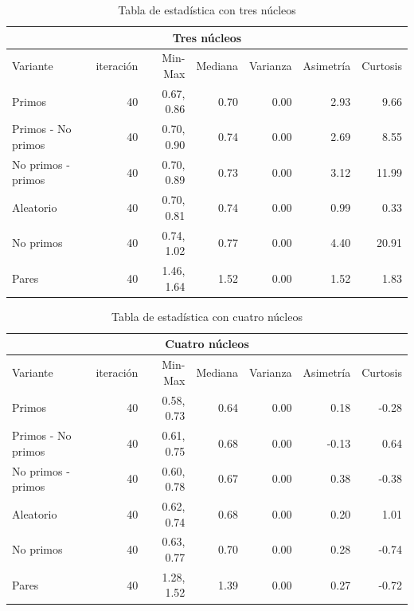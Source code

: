 \documentclass{article}
\begin{document}
\begin{table}[H]
\begin{center}
\begin{tabular}{|l | r | r | r | r | r | r|}
\hline
\multicolumn{7}{|c|}{Tres núcleos}\\
\hline
Variante&iteración&Min-Max&Mediana&Varianza&Asimetría&Curtosis\\
\hline
 Primos               & 40 & 0.67, 0.86  & 0.70 & 0.00 & 2.93   & 9.66\\
 Primos - No primos   & 40 & 0.70, 0.90  & 0.74 & 0.00 & 2.69   & 8.55\\
 No primos - primos   & 40 & 0.70, 0.89  & 0.73 & 0.00 & 3.12   & 11.99\\
 Aleatorio            & 40 & 0.70, 0.81  & 0.74 & 0.00 & 0.99   & 0.33\\
 No primos            & 40 & 0.74, 1.02  & 0.77 & 0.00 & 4.40   & 20.91\\
 Pares                & 40 & 1.46, 1.64  & 1.52 & 0.00 & 1.52   & 1.83\\
\hline
\end{tabular}
\caption{Tabla de estadística con tres núcleos}
\label{table:1}
\end{center}
\end{table}

\begin{table}[H]
\begin{center}
\begin{tabular}{|l | r | r | r | r | r | r|}
\hline
\multicolumn{7}{|c|}{Cuatro núcleos}\\
\hline
Variante&iteración&Min-Max&Mediana&Varianza&Asimetría&Curtosis\\
\hline
 Primos               & 40 & 0.58, 0.73  & 0.64 & 0.00 & 0.18   & -0.28\\
 Primos - No primos   & 40 & 0.61, 0.75  & 0.68 & 0.00 & -0.13   & 0.64\\
 No primos - primos   & 40 & 0.60, 0.78  & 0.67 & 0.00 & 0.38   & -0.38\\
 Aleatorio            & 40 & 0.62, 0.74  & 0.68 & 0.00 & 0.20   & 1.01\\
 No primos            & 40 & 0.63, 0.77  & 0.70 & 0.00 & 0.28   & -0.74\\
 Pares                & 40 & 1.28, 1.52  & 1.39 & 0.00 & 0.27   & -0.72\\
\hline
\end{tabular}
\caption{Tabla de estadística con cuatro núcleos}
\label{table:1}
\end{center}
\end{table}
\end{document}

